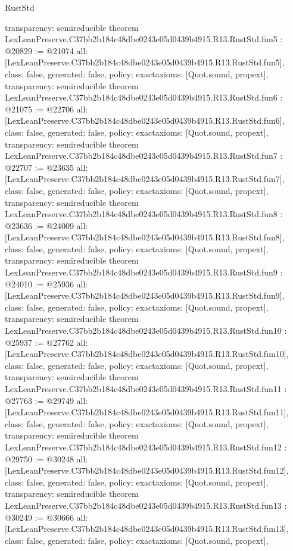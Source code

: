 \begin{lexlean}{RustStd}
\begin{coremodule}
{  transparency: semireducible
}
theorem LexLeanPreserve.C37bb2b184c48dbe0243e05d0439b4915.R13.RustStd.fun5 : @20829 := @21074 {
  all: [LexLeanPreserve.C37bb2b184c48dbe0243e05d0439b4915.R13.RustStd.fun5],
  class: false,
  generated: false,
  policy: exact{axioms: [Quot.sound, propext]},
  transparency: semireducible
}
theorem LexLeanPreserve.C37bb2b184c48dbe0243e05d0439b4915.R13.RustStd.fun6 : @21075 := @22706 {
  all: [LexLeanPreserve.C37bb2b184c48dbe0243e05d0439b4915.R13.RustStd.fun6],
  class: false,
  generated: false,
  policy: exact{axioms: [Quot.sound, propext]},
  transparency: semireducible
}
theorem LexLeanPreserve.C37bb2b184c48dbe0243e05d0439b4915.R13.RustStd.fun7 : @22707 := @23635 {
  all: [LexLeanPreserve.C37bb2b184c48dbe0243e05d0439b4915.R13.RustStd.fun7],
  class: false,
  generated: false,
  policy: exact{axioms: [Quot.sound, propext]},
  transparency: semireducible
}
theorem LexLeanPreserve.C37bb2b184c48dbe0243e05d0439b4915.R13.RustStd.fun8 : @23636 := @24009 {
  all: [LexLeanPreserve.C37bb2b184c48dbe0243e05d0439b4915.R13.RustStd.fun8],
  class: false,
  generated: false,
  policy: exact{axioms: [Quot.sound, propext]},
  transparency: semireducible
}
theorem LexLeanPreserve.C37bb2b184c48dbe0243e05d0439b4915.R13.RustStd.fun9 : @24010 := @25936 {
  all: [LexLeanPreserve.C37bb2b184c48dbe0243e05d0439b4915.R13.RustStd.fun9],
  class: false,
  generated: false,
  policy: exact{axioms: [Quot.sound, propext]},
  transparency: semireducible
}
theorem LexLeanPreserve.C37bb2b184c48dbe0243e05d0439b4915.R13.RustStd.fun10 : @25937 := @27762 {
  all: [LexLeanPreserve.C37bb2b184c48dbe0243e05d0439b4915.R13.RustStd.fun10],
  class: false,
  generated: false,
  policy: exact{axioms: [Quot.sound, propext]},
  transparency: semireducible
}
theorem LexLeanPreserve.C37bb2b184c48dbe0243e05d0439b4915.R13.RustStd.fun11 : @27763 := @29749 {
  all: [LexLeanPreserve.C37bb2b184c48dbe0243e05d0439b4915.R13.RustStd.fun11],
  class: false,
  generated: false,
  policy: exact{axioms: [Quot.sound, propext]},
  transparency: semireducible
}
theorem LexLeanPreserve.C37bb2b184c48dbe0243e05d0439b4915.R13.RustStd.fun12 : @29750 := @30248 {
  all: [LexLeanPreserve.C37bb2b184c48dbe0243e05d0439b4915.R13.RustStd.fun12],
  class: false,
  generated: false,
  policy: exact{axioms: [Quot.sound, propext]},
  transparency: semireducible
}
theorem LexLeanPreserve.C37bb2b184c48dbe0243e05d0439b4915.R13.RustStd.fun13 : @30249 := @30666 {
  all: [LexLeanPreserve.C37bb2b184c48dbe0243e05d0439b4915.R13.RustStd.fun13],
  class: false,
  generated: false,
  policy: exact{axioms: [Quot.sound, propext]},
}
\end{coremodule}
\end{lexlean}
